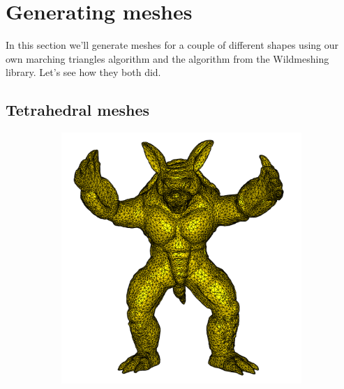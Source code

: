 \documentclass[acmtog]{acmart}
\begin{document}
\section{Generating meshes}
In this section we'll generate meshes for a couple of different shapes using
our own marching triangles algorithm and the algorithm from the Wildmeshing
library. Let's see how they both did.

\subsection*{Tetrahedral meshes}
\begin{figure}[H]
  \centering
  \begin{subfigure}{0.22\textwidth}
    \centering
    \includegraphics[width=\textwidth]{Images/armadillo_coarse.png}
  \end{subfigure}
  \begin{subfigure}{0.22\textwidth}

\end{subfigure}
\end{figure}
\end{document}
